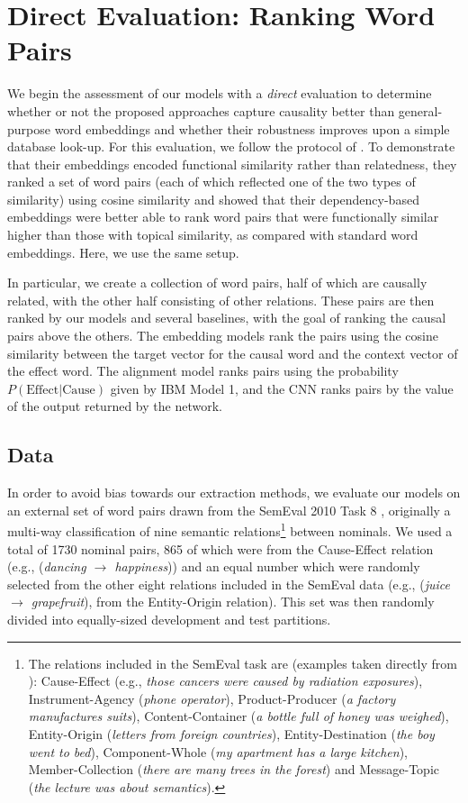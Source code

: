 
\section{Direct Evaluation: Ranking Word Pairs}
\label{sec-emnlp2016:directeval}


We begin the assessment of our models with a {\em direct} evaluation to determine whether or not the proposed approaches capture causality better than general-purpose word embeddings and whether their robustness improves upon a simple database look-up.
For this evaluation, we follow the protocol of \citet{levy2014dependency}.  
To demonstrate that their embeddings encoded functional similarity rather than relatedness, they ranked a set of word pairs (each of which reflected one of the two types of similarity) using cosine similarity and showed that their dependency-based embeddings were better able to rank word pairs that were functionally similar higher than those with topical similarity, as compared with standard word embeddings.  Here, we use the same setup. 
 
In particular, we create a collection of word pairs, half of which are causally related, with the other half consisting of other relations. 
These pairs are then ranked by our models and several baselines, with the goal of ranking the causal pairs above the others. 
The embedding models rank the pairs using the cosine similarity between the target vector for the causal word and the context vector of the effect word.  The alignment model ranks pairs using the probability $P(\text{Effect}|\text{Cause})$ given by IBM Model 1, and the CNN ranks pairs by the value of the output returned by the network.

\subsection{Data}
In order to avoid bias towards our extraction methods, we evaluate our models on an external set of word pairs drawn from the SemEval 2010 Task 8 \citep{hendrickx2009semeval}, originally a multi-way classification of nine semantic relations\footnote{The relations included in the SemEval task are (examples taken directly from \citet{hendrickx2009semeval}): Cause-Effect (e.g.,  \textit{those cancers were caused by radiation exposures}), 
Instrument-Agency (\textit{phone operator}),
Product-Producer (\textit{a factory manufactures suits}),
Content-Container (\textit{a bottle full of honey was weighed}),
Entity-Origin (\textit{letters from foreign countries}),
Entity-Destination (\textit{the boy went to bed}),
Component-Whole (\textit{my apartment has a large kitchen}),
Member-Collection (\textit{there are many trees in the forest})
and Message-Topic (\textit{the lecture was about semantics}).} between nominals.  We used a total of 1730 nominal pairs, 865 of which were from the Cause-Effect relation (e.g., (\emph{dancing $\rightarrow$ happiness})) and an equal number which were randomly selected from the other eight relations included in the SemEval data (e.g., (\emph{juice $\rightarrow$ grapefruit}), from the Entity-Origin relation).  This set was then randomly divided into equally-sized development and test partitions.

